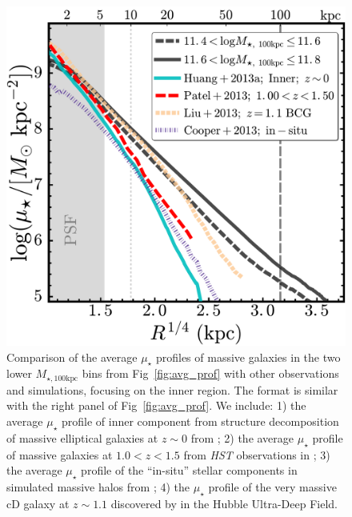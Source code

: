 \documentclass[a4paper,fleqn,usenatbib]{mnras}
\def\mtot{{$M_{\star,100\mathrm{kpc}}$}}
\def\mden{{$\mu_{\star}$}}
\begin{document}
  \begin{figure}
      \centering 
      \includegraphics[width=\columnwidth]{fig/redbcg_discussion_1}
      \caption{Comparison of the average \mden{} profiles of massive galaxies in the 
          two lower \mtot{} bins from Fig~\ref{fig:avg_prof} with other observations 
          and simulations, focusing on the inner region. 
          The format is similar with the right panel of Fig~\ref{fig:avg_prof}.
          We include: 
          1) the average \mden{} profile of inner component from structure 
          decomposition of massive elliptical galaxies at $z\sim 0$ from 
          \citet[][Cyan, solid]{Huang2013a}; 
          2) the average \mden{} profile of massive galaxies at $1.0 < z < 1.5$ 
          from \textit{HST} observations in \citet[][Red, dashed]{Patel2013}; 
          3) the average \mden{} profile of the ``in-situ'' stellar components in 
          simulated massive halos from \citet[][Purple, dot-dashed]{Cooper13};
          4) the \mden{} profile of the very massive cD galaxy at $z\sim 1.1$ 
          discovered by \citet[][Yellow, dashed]{Liu2013} in the Hubble 
          Ultra-Deep Field.}
      \label{fig:discussion_1}
  \end{figure}
\end{document}
